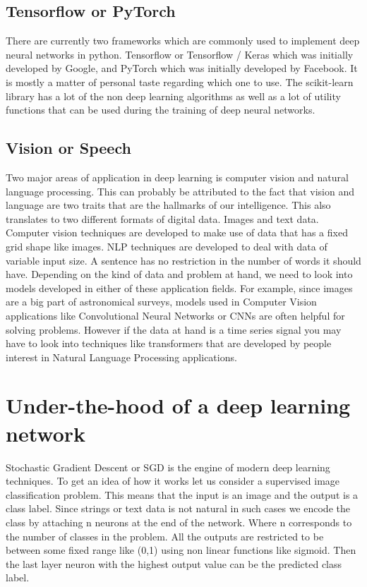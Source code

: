 \documentclass{../template/texnote}
\begin{document}
\subsection{Tensorflow or PyTorch}

There are currently two frameworks which are commonly used to implement deep neural  networks in python. Tensorflow or Tensorflow / Keras which was initially developed by Google, and PyTorch which was initially developed by Facebook. It is mostly a matter of personal taste regarding which one to use. The scikit-learn library has a lot of the non deep learning algorithms as well as a lot of utility functions that can be used during the training of deep neural networks.

\subsection{Vision or Speech}

Two major areas of application in deep learning is computer vision and natural language processing. This can probably be attributed to the fact that vision and language are two traits that are the hallmarks of our intelligence. This also translates to two different formats of digital data. Images and text data. Computer vision techniques are developed to make use of data that has a fixed grid shape like images. NLP techniques are developed to deal with data of variable input size. A sentence has no restriction in the number of words it should have. Depending on the kind of data and problem at hand, we need to look into models developed in either of these application fields. For example, since images are a big part of astronomical surveys, models used in Computer Vision applications like Convolutional Neural Networks or CNNs are often helpful for solving problems. However if the data at hand is a time series signal you may have to look into techniques like transformers that are developed by people interest in Natural Language Processing applications.

\section{Under-the-hood of a deep learning network}

Stochastic Gradient Descent or SGD is the engine of modern deep learning techniques. To get an idea of how it works let us consider a supervised image classification problem. This means that the input is an image and the output is a class label. Since strings or text data is not natural in such cases we encode the class by attaching n neurons at the end of the network. Where n corresponds to the number of classes in the problem. All the outputs are restricted to be between some fixed range like (0,1) using non linear functions like sigmoid. Then the last layer neuron with the highest output value can be the predicted class label.
\end{document}

